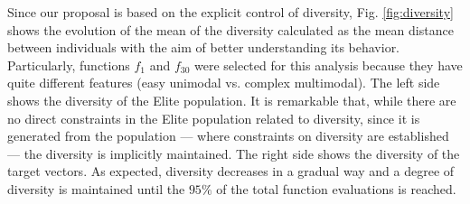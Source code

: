 
Since our proposal is based on the explicit control of diversity, Fig. \ref{fig:diversity} shows the evolution of the mean of the diversity calculated
as the mean distance between individuals with the aim of better understanding its behavior.
%
Particularly, functions $f_1$ and $f_{30}$ were selected for this analysis because they have quite different features (easy unimodal vs. complex multimodal).
%
The left side shows the diversity of the Elite population.
%
It is remarkable that, while there are no direct constraints in the Elite population related to diversity, since it is generated from the population --- where constraints on diversity
are established --- the diversity is implicitly maintained.
%
The right side shows the diversity of the target vectors.
%
As expected, diversity decreases in a gradual way and a degree of diversity is maintained until the $95\%$ of the total function evaluations is reached.

